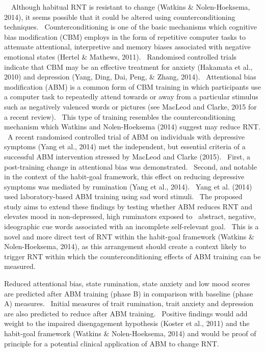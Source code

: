 \documentclass[man,a4paper,biblatex]{apa6}
\begin{document}
\ \ Although habitual RNT is resistant to change (Watkins \& Nolen-Hoeksema, 2014), it seems possible that it could be altered using counterconditioning techniques. \ Counterconditioning is one of the basic mechanisms which cognitive bias modification (CBM) employs in the form of repetitive computer tasks to attenuate attentional, interpretive and memory biases associated with negative emotional states (Hertel \& Mathews, 2011). \ Randomised controlled trials indicate that CBM may be an effective treatment for anxiety (Hakamata et al., 2010) and depression (Yang, Ding, Dai, Peng, \& Zhang, 2014). \ Attentional bias modification (ABM) is a common form of CBM training in which participants use a computer task to repeatedly attend towards or away from a particular stimulus such as negatively valenced words or pictures (see MacLeod and Clarke, 2015 for a recent review). \ This type of training resembles the counterconditioning mechanism which Watkins and Nolen-Hoeksema (2014) suggest may reduce RNT. \ A recent randomised controlled trial of ABM on individuals with depressive symptoms (Yang et al., 2014) met the independent, but essential criteria of a successful ABM intervention stressed by MacLeod and Clarke (2015). \ First, a post-training change in attentional bias was demonstrated. \ Second, and notable in the context of the habit-goal framework, this effect on reducing depressive symptoms was mediated by rumination (Yang et al., 2014). \ Yang et al. (2014) used laboratory-based ABM training using sad word stimuli. \ The proposed study aims to extend these findings by testing whether ABM reduces RNT and elevates mood in non-depressed, high ruminators exposed to \ abstract, negative, ideographic cue words associated with an incomplete self-relevant goal. \ This is a novel and more direct test of RNT within the habit-goal framework (Watkins \& Nolen-Hoeksema, 2014), as this arrangement should create a context likely to trigger RNT within which the counterconditioning effects of ABM training can be measured.

Reduced attentional bias, state rumination, state anxiety and low mood scores are predicted after ABM training (phase B) in comparison with baseline (phase A) measures. \ Initial measures of trait rumination, trait anxiety and depression are also predicted to reduce after ABM training. \ Positive findings would add weight to the impaired disengagement hypothesis (Koster et al., 2011) and the habit-goal framework (Watkins \& Nolen-Hoeksema, 2014) and would be proof of principle for a potential clinical application of ABM to change RNT.
\end{document}
